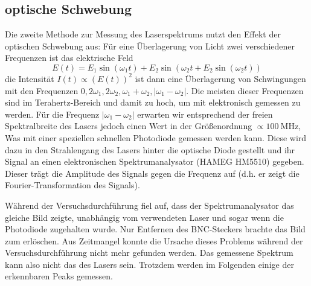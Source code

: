 \documentclass{article}
\begin{document}
\subsection{optische Schwebung}
Die zweite Methode zur Messung des Laserspektrums nutzt den Effekt der optischen Schwebung aus:
Für eine Überlagerung von Licht zwei verschiedener Frequenzen ist das elektrische Feld \cite{Anleitung}
\[
  E(t) = E_1 \sin(\omega_1 t) + E_2 \sin(\omega_2 t + E_2 \sin(\omega_2 t))
\]
die Intensität $I(t) \propto (E(t))^2$ ist dann eine Überlagerung von Schwingungen mit den Frequenzen
$0, 2\omega_1, 2\omega_2, \omega_1+\omega_2, \lvert \omega_1-\omega_2 \rvert$.
Die meisten dieser Frequenzen sind im Terahertz-Bereich und damit zu hoch, um mit elektronisch gemessen zu werden.
Für die Frequenz $\lvert \omega_1-\omega_2 \rvert$ erwarten wir
entsprechend der freien Spektralbreite des Lasers jedoch einen Wert in der Größenordnung $\propto \SI{100}{\MHz}$,
Was mit einer speziellen schnellen Photodiode gemessen werden kann. Diese wird dazu in den Strahlengang des Lasers
hinter die optische Diode gestellt und ihr Signal an einen elektronischen Spektrumanalysator (HAMEG HM5510) gegeben.
Dieser trägt die Amplitude des Signals gegen die Frequenz auf (d.h. er zeigt die Fourier-Transformation des Signals).

Während der Versuchsdurchführung fiel auf, dass der Spektrumanalysator das gleiche Bild zeigte, unabhängig vom verwendeten Laser
und sogar wenn die Photodiode zugehalten wurde. Nur Entfernen des BNC-Steckers brachte das Bild zum erlöschen.
Aus Zeitmangel konnte die Ursache dieses Problems während der Versuchsdurchführung nicht mehr gefunden werden.
Das gemessene Spektrum kann also nicht das des Lasers sein. Trotzdem werden im Folgenden einige der erkennbaren Peaks gemessen.
\end{document}
